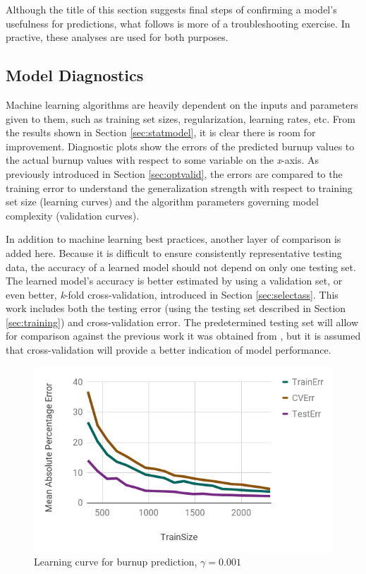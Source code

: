 Although the title of this section suggests final steps of confirming a model's
usefulness for predictions, what follows is more of a troubleshooting exercise. 
In practive, these analyses are used for both purposes.

\subsection{Model Diagnostics}
\label{sec:algeval}

Machine learning algorithms are heavily dependent on the inputs and parameters
given to them, such as training set sizes, regularization, learning rates, etc.
From the results shown in Section \ref{sec:statmodel}, it is clear there is
room for improvement.  Diagnostic plots show the errors of the predicted
burnup values to the actual burnup values with respect to some variable on the
\textit{x}-axis.  As previously introduced in Section \ref{sec:optvalid}, the
errors are compared to the training error to understand the generalization
strength with respect to training set size (learning curves) and the algorithm
parameters governing model complexity (validation curves). 

In addition to machine learning best practices, another layer of comparison is
added here.  Because it is difficult to ensure consistently representative
testing data, the accuracy of a learned model should not depend on only one
testing set.  The learned model's accuracy is better estimated by using a
validation set, or even better, \textit{k}-fold cross-validation, introduced in
Section \ref{sec:selectass}. This work includes both the testing error (using
the testing set described in Section \ref{sec:training}) and cross-validation
error. The predetermined testing set will allow for comparison against the
previous work it was obtained from \cite{dayman_feasibility_2013}, but it is
assumed that cross-validation will provide a better indication of model
performance.

\begin{figure}[!htb]
    \centering
    \includegraphics[width=\linewidth]{./chapters/demo_method/lc1.png}
    \caption{Learning curve for burnup prediction, $\gamma = 0.001$}
    \label{fig:lc1}
\end{figure}

